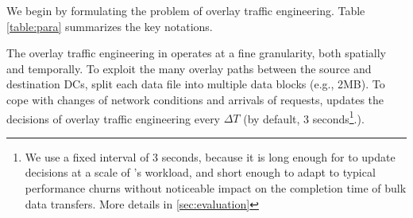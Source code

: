 \begin{table}[t]
\begin{center}
\end{center}
\caption{Notations used in \name's decision-making logic.}
\vspace{-0.8cm}
\label{table:para}
\end{table}

We begin by formulating the problem of overlay traffic engineering.
Table \ref{table:para} summarizes the key notations.

The overlay traffic engineering in \name operates at a
fine granularity, both spatially and temporally. To exploit the many
overlay paths between the source and destination DCs, \name split
each data file into multiple data blocks (e.g., 2MB).
To cope with changes of network conditions and arrivals of requests,
\name updates the decisions of overlay traffic engineering every
$\Delta T$ (by default, 3 seconds\footnote{We use a fixed interval of
3 seconds, because it is long enough for \name to update decisions at
a scale of \company's workload, and short enough to adapt to typical
performance churns without noticeable impact on the completion time
of bulk data transfers.
More details in \Section\ref{sec:evaluation}}.).


